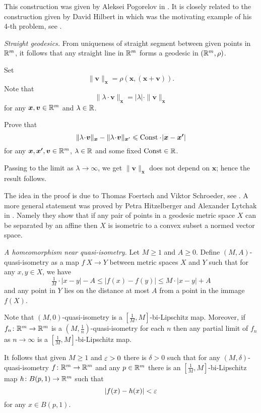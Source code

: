 This construction was given by 
Aleksei Pogorelov in \cite{pogorelov}.
It is closely related to the construction given 
by David Hilbert in \cite{hilbert}
which was the motivating example of his 4-th problem,
see \cite{hilbert-problems}.


\textit{Straight geodesics.}
From uniqueness of straight segment between given points in $\mathbb{R}^m$,
it follows that any straight line in $\mathbb{R}^m$ forms a geodesic in $(\mathbb{R}^m,\rho)$.

Set 
\[\|\bm{v}\|_{\bm{x}}=\rho(\bm{x},(\bm{x}+\bm{v})).\]
Note that 
\[ \|\lambda\cdot\bm{v}\|_{\bm{x}}
=
|\lambda|\cdot\|\bm{v}\|_{\bm{x}}\]
for any $\bm{x},\bm{v}\in\mathbb{R}^m$ and $\lambda\in\mathbb{R}$.

Prove that 
\[
\|\lambda\cdot\bm{v}\|_{\bm{x}}
-
\|\lambda\cdot\bm{v}\|_{\bm{x}'}
\le 
\Const\cdot |\bm{x}-\bm{x'}|\]
for any $\bm{x},\bm{x'},\bm{v}\in\mathbb{R}^m$, 
$\lambda\in\mathbb{R}$
and some fixed $\operatorname{\rm Const}\in\mathbb{R}$.

Passing to the limit as $\lambda\to\infty$, 
we get
$\|\bm{v}\|_{\bm{x}}$ does not depend on $\bm{x}$;
hence the result follows.

The idea in the proof is due to Thomas Foertsch
and Viktor Schroeder, see \cite{foertsch-schroeder}.
A more general statement was proved by Petra Hitzelberger and Alexander Lytchak in \cite{hitzelberger-lytchak}.
Namely they show that if any pair of points in a geodesic metric space $X$ can be separated by an affine then $X$ is isometric to a convex subset a normed vector space.


\textit{A homeomorphism near quasi-isometry.}
Let $M\ge 1$ and $A\ge 0$.
Define $(M,A)$-quasi-isometry
as a map $f\:X\to Y$ between metric spaces $X$ and $Y$ such that for any $x,y\in X$,
 we have
\[\tfrac1M\cdot |x-y|-A\le |f(x)-f(y)|\le M\cdot |x-y|+A\]
and any point in $Y$ lies on the distance at most $A$ from a point in the immage $f(X)$.

Note that $(M,0)$-quasi-isometry is a $[\tfrac1M,M]$-bi-Lipschitz map.
Moreover,
if $f_n\colon\mathbb{R}^m\to\mathbb{R}^m$ is a  $(M,\frac1n)$-quasi-isometry 
for each $n$ then any partial limit of $f_n$ as $n\to\infty$
is a $[\tfrac1M,M]$-bi-Lipschitz map.

It follows that given $M\ge 1$ and $\varepsilon>0$ there is $\delta>0$ such that 
for any $(M,\delta)$-quasi-isometry $f\colon\mathbb{R}^m\to\mathbb{R}^m$ and any $p\in \mathbb{R}^m$
there is an $[\tfrac1M,M]$-bi-Lipschitz map $h\colon B(p,1)\to \mathbb{R}^m$
such that
\[|f(x)-h(x)|<\varepsilon\]
for any $x\in B(p,1)$.

